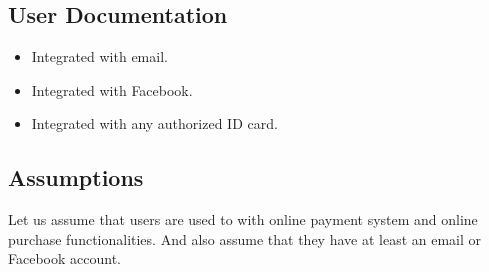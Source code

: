 \documentclass{article}
\begin{document}
\subsection{User Documentation}
\begin{itemize}
\item Integrated with email.
\item Integrated with Facebook.
\item Integrated with any authorized ID card.
\end{itemize}
\subsection{Assumptions}
Let us assume that users are used to with online payment system and online purchase functionalities. And also assume that they have at least an email or Facebook account.
\end{document}

